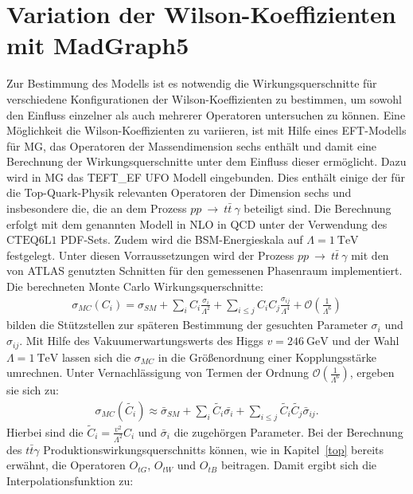 \section{Variation der Wilson-Koeffizienten mit MadGraph5}%
%
Zur Bestimmung des Modells ist es notwendig die Wirkungsquerschnitte für verschiedene Konfigurationen der Wilson-Koeffizienten zu bestimmen, um sowohl den Einfluss einzelner als auch mehrerer Operatoren untersuchen zu können.
Eine Möglichkeit die Wilson-Koeffizienten zu variieren, ist mit Hilfe eines  EFT-Modells für MG, das Operatoren der Massendimension sechs enthält und damit eine Berechnung der Wirkungsquerschnitte unter dem Einfluss dieser ermöglicht. Dazu wird in MG das TEFT\_EF UFO Modell\cite{EFTModell} eingebunden.
Dies enthält einige der für die Top-Quark-Physik relevanten Operatoren der Dimension sechs und insbesondere die, die an dem Prozess $pp~\rightarrow~t\bar{t}~\gamma$ beteiligt sind.
Die Berechnung erfolgt mit dem genannten Modell in NLO in QCD unter der Verwendung des $\text{CTEQ}6\text{L}1$ PDF-Sets.
Zudem wird die BSM-Energieskala auf $\Lambda = \SI{1}{\tera\electronvolt}$ festgelegt.
Unter diesen Vorraussetzungen wird der Prozess $pp~\rightarrow~t\bar{t}~\gamma$ mit den von ATLAS genutzten Schnitten für den gemessenen Phasenraum implementiert.\\
Die berechneten Monte Carlo Wirkungsquerschnitte:
\begin{align}
  \sigma_{MC}({C_i}) = \sigma_{SM} + \sum_{i} C_i \frac{\sigma_i}{\Lambda^2} + \sum_{i \leq j} C_i C_j \frac{\sigma_{ij}}{\Lambda^4} + \mathcal{O}\left(\frac{1}{\Lambda^6}\right)
\end{align}
bilden die Stützstellen zur späteren Bestimmung der gesuchten Parameter $\sigma_i$ und $\sigma_{ij}$.
Mit Hilfe des Vakuumerwartungswerts des Higgs $v = \SI{246}{\giga\electronvolt}$ und der Wahl $\Lambda = \SI{1}{\tera\electronvolt}$ lassen sich die $\sigma_{MC}$ in die Größenordnung einer Kopplungsstärke umrechnen.
Unter Vernachlässigung von Termen der Ordnung $\mathcal{O}(\frac{1}{\Lambda^6})$, ergeben sie sich zu:
\begin{align}
  \sigma_{MC}({\tilde{C_i}}) \approx \bar{\sigma}_{SM} + \sum_{i} \tilde{C_i} \bar{\sigma_i} + \sum_{i \leq j} \tilde{C_i} \tilde{C_j} \bar{\sigma}_{ij}.
\end{align}
Hierbei sind die $\tilde{C}_i = \frac{v^2}{\Lambda^2} C_i$ und $\bar{\sigma}_i$ die zugehörgen Parameter.
Bei der Berechnung des $t\bar{t}\gamma$ Produktionswirkungsquerschnitts können, wie in Kapitel~\ref{top} bereits erwähnt, die Operatoren $O_{tG}$, $O_{tW}$ und $O_{tB}$ beitragen. Damit ergibt sich die Interpolationsfunktion zu:
